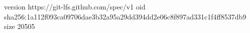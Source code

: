 version https://git-lfs.github.com/spec/v1
oid sha256:1a112f093ca09706dae3b32a95a29dd394dd2e06c8f897ad331c1f4ff8537db9
size 20505
